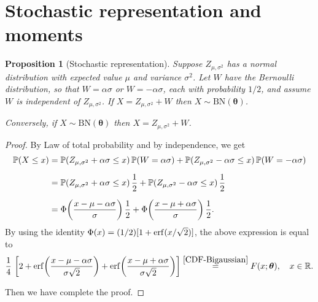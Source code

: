 \documentclass[12pt]{article}
\newtheorem{proposition}[theorem]{Proposition}
\theoremstyle{definition}
\begin{document}
\section{Stochastic representation and moments}\label{sec:stoch:mom}

\begin{proposition}[Stochastic representation]\label{Stochastic representation}
Suppose $Z_{\mu,\sigma^2}$ has a normal distribution with expected value $\mu$ and variance $\sigma^2$. Let $W$ have the Bernoulli distribution, so that $W=\alpha\sigma$ or $W=-\alpha\sigma$, each with probability $1/2$, and assume $W$ is independent of $Z_{\mu,\sigma^2}$.
If $X=Z_{\mu,\sigma^2}+W$
then $X\sim \text{BN}(\boldsymbol{\theta})$.

Conversely, if $X\sim \text{BN}(\boldsymbol{\theta})$ then $X=Z_{\mu,\sigma^2}+W$.
\end{proposition}
\begin{proof} 
By Law of total probability and by independence, we get 
\begin{align*}
\mathbb{P}(X\leq x)
&=
\mathbb{P}(Z_{\mu,\sigma^2}+\alpha\sigma\leq x)\, \mathbb{P}(W=\alpha\sigma)+\mathbb{P}(Z_{\mu,\sigma^2}-\alpha\sigma\leq x)\, \mathbb{P}(W=-\alpha\sigma)
\\[0,2cm]
&=
\mathbb{P}(Z_{\mu,\sigma^2}+\alpha\sigma\leq x)\, {1\over 2}+\mathbb{P}(Z_{\mu,\sigma^2}-\alpha\sigma\leq x)\, {1\over 2}
\\[0,2cm]
&=
\Phi\biggl({x-\mu-\alpha\sigma\over\sigma}\biggr)\, {1\over 2}
+
\Phi\biggl({x-\mu+\alpha\sigma\over\sigma}\biggr)\, {1\over 2}.
\end{align*}
By using the identity $\Phi(x)=(1/2)[1+{\rm erf}({x/\sqrt{2}})]$, the above expression is equal to
\begin{align*}
{1\over 4}\, 
\left[2+{\rm erf}\biggl({x-\mu-\alpha\sigma\over \sigma\sqrt{2}}\biggr)
+
{\rm erf}\biggl({x-\mu+\alpha\sigma\over \sigma\sqrt{2} }\biggr)\right]
\stackrel{\eqref{CDF-Bigaussian}}{=}
F(x;\boldsymbol{\theta}),
\quad x\in\mathbb{R}.
\end{align*}

%
%
Then we have complete the proof.
\end{proof}
\end{document}
